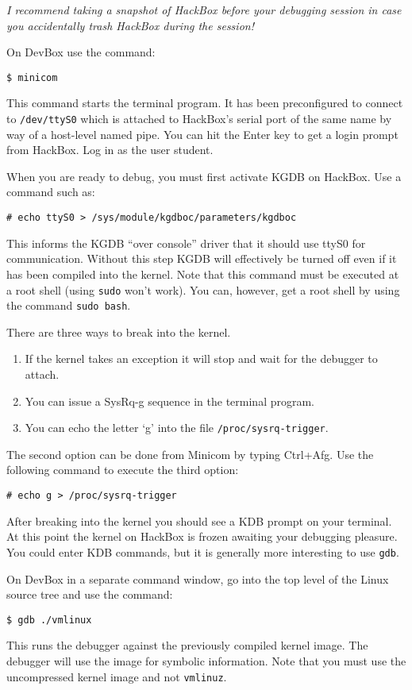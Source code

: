 \documentclass{article}
\newcommand{\command}[1]{\texttt{#1}}
\newcommand{\filename}[1]{\texttt{#1}}
\begin{document}
\emph{I recommend taking a snapshot of HackBox before your debugging session in case you
  accidentally trash HackBox during the session!}

On DevBox use the command:
\begin{Verbatim}
$ minicom
\end{Verbatim}
This command starts the terminal program. It has been preconfigured to connect to
\filename{/dev/ttyS0} which is attached to HackBox's serial port of the same name by way of a
host-level named pipe. You can hit the Enter key to get a login prompt from HackBox. Log in as
the user student.

When you are ready to debug, you must first activate KGDB on HackBox. Use a command such as:
\begin{Verbatim}
# echo ttyS0 > /sys/module/kgdboc/parameters/kgdboc
\end{Verbatim}
This informs the KGDB ``over console'' driver that it should use ttyS0 for communication.
Without this step KGDB will effectively be turned off even if it has been compiled into the
kernel. Note that this command must be executed at a root shell (using \texttt{sudo} won't
work). You can, however, get a root shell by using the command \command{sudo bash}.

There are three ways to break into the kernel.
\begin{enumerate}
\item If the kernel takes an exception it will stop and wait for the debugger to attach.
\item You can issue a SysRq-g sequence in the terminal program.
\item You can echo the letter `g' into the file \texttt{/proc/\-sysrq-trigger}.
\end{enumerate}

The second option can be done from Minicom by typing Ctrl+Afg. Use the following command to
execute the third option:
\begin{Verbatim}
# echo g > /proc/sysrq-trigger
\end{Verbatim}

After breaking into the kernel you should see a KDB prompt on your terminal. At this point the
kernel on HackBox is frozen awaiting your debugging pleasure. You could enter KDB commands, but
it is generally more interesting to use \command{gdb}.

On DevBox in a separate command window, go into the top level of the Linux source tree and use
the command:
\begin{Verbatim}
$ gdb ./vmlinux
\end{Verbatim}
This runs the debugger against the previously compiled kernel image. The debugger will use the
image for symbolic information. Note that you must use the uncompressed kernel image and not
\texttt{vmlinuz}.
\end{document}
